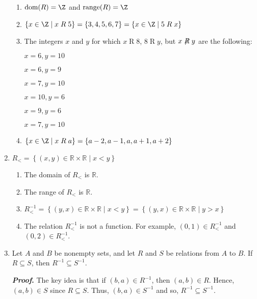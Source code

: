 \begin{enumerate}
\begin{enumerate}
\item $\text{dom}(R) = \Z$ and $\text{range}(R) = \Z$

\item $\{ x \in \Z \mid x \mathrel{R} 5 \} = \{3, 4, 5, 6, 7 \} = \{ x \in \Z \mid 5 \mathrel{R} x \}$

\item The integers $x$ and $y$ for which $x \mathrel{R} 8$, $8 \mathrel{R} y$, but 
$x \mathrel{\not \negthickspace R} y$ are the following: 

\begin{multicols}{3}
$x = 6, y = 10$

$x = 6, y = 9$
 
$x = 7, y = 10$

$x = 10, y = 6$

$x = 9, y = 6$

$x = 7, y = 10$
\end{multicols}

\item $\{ x \in \Z \mid x \mathrel{R} a \} = \{a - 2, a - 1, a, a + 1, a + 2 \}$
\end{enumerate}



\item $R_{  < }  = \left\{ { {\left( {x, y} \right) \in \mathbb{R} \times \mathbb{R} } \mid x < y} \right\}$
\begin{enumerate}
\item The domain of $R_{  < }$ is $\mathbb{R}$.

\item The range of $R_{  < }$ is $\mathbb{R}$.

\item $R_{<}^{-1} = \left\{ \left( {y, x} \right) \in \mathbb{R} \times \mathbb{R} \mid x <  y \right\} = \left\{ \left( {y, x} \right) \in \mathbb{R} \times \mathbb{R} \mid y > x \right\}$ 

\item The relation $R_{<}^{-1}$ is not a function.  For example, 
$\left( 0, 1 \right) \in R_{<}^{-1}$ and $\left( 0, 2 \right) \in R_{<}^{-1}$.
\end{enumerate}

\item Let  $A$  and  $B$  be nonempty sets, and let  $R$  and  $S$  be relations from  $A$  to  $B$. If  $R \subseteq S$, then  $R^{ - 1}  \subseteq S^{ - 1} $.

\textbf{\emph{Proof}.}  The key idea is that if $\left( b, a \right) \in R^{ - 1}$, then 
$\left( a, b \right) \in R$.  Hence, $\left( a, b \right) \in S$ since $R \subseteq S$.  Thus, 
$\left( b, a \right) \in S^{ - 1}$ and so, $R^{-1} \subseteq S^{-1}$.

\end{enumerate}
\hbreak

\endinput
